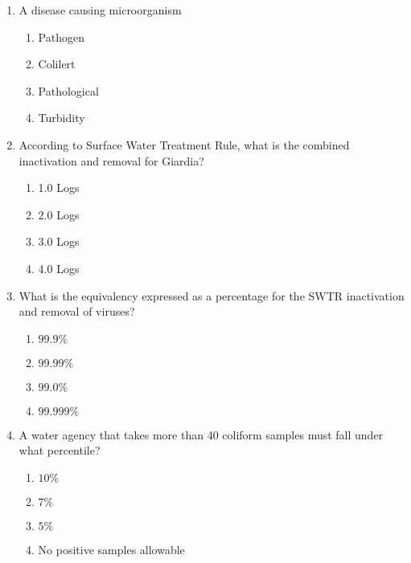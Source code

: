 \documentclass{article}
\begin{document}
\begin{enumerate}
  \item A disease causing microorganism\\
\begin{enumerate}
\item Pathogen\\
\item Colilert\\
\item Pathological\\
\item Turbidity
\end{enumerate}

\item  According to Surface Water Treatment Rule, what is the combined inactivation and removal for Giardia?\\
\begin{enumerate}
\item 1.0 Logs\\
\item $2.0$ Logs\\
\item 3.0 Logs\\
\item 4.0 Logs
\end{enumerate}

\item  What is the equivalency expressed as a percentage for the SWTR inactivation and removal of viruses?\\
\begin{enumerate}
\item $99.9 \%$\\
\item $99.99 \%$\\
\item $99.0 \%$\\
\item $99.999 \%$
\end{enumerate}

\item  A water agency that takes more than 40 coliform samples must fall under what percentile?\\
\begin{enumerate}
\item $10 \%$\\
\item $7 \%$\\
\item $5 \%$\\
\item No positive samples allowable
\end{enumerate}


\end{enumerate}
\end{document}

